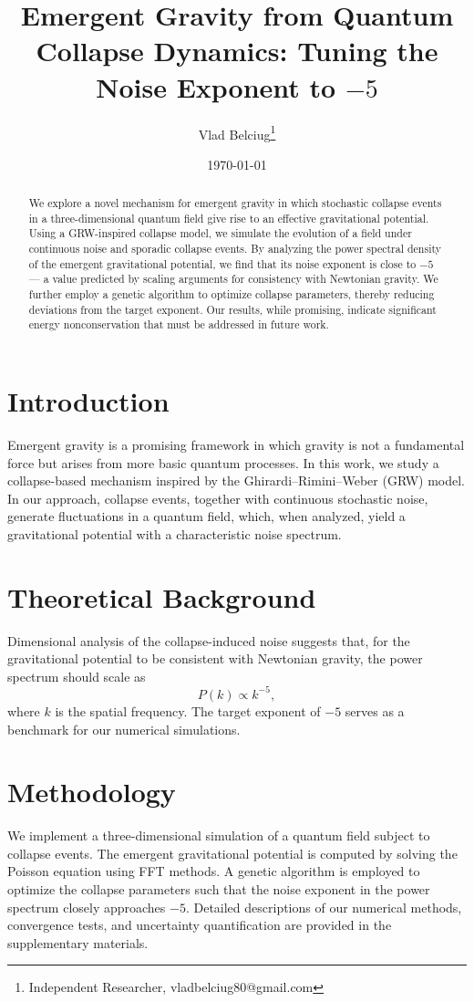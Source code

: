 \documentclass[12pt]{article}
\title{Emergent Gravity from Quantum Collapse Dynamics: Tuning the Noise Exponent to \(-5\)}
\author{Vlad Belciug\thanks{Independent Researcher, vladbelciug80@gmail.com} }
\date{\today}
\begin{document}
\maketitle

\begin{abstract}
We explore a novel mechanism for emergent gravity in which stochastic collapse events in a three-dimensional quantum field give rise to an effective gravitational potential. Using a GRW-inspired collapse model, we simulate the evolution of a field under continuous noise and sporadic collapse events. By analyzing the power spectral density of the emergent gravitational potential, we find that its noise exponent is close to \(-5\) --- a value predicted by scaling arguments for consistency with Newtonian gravity. We further employ a genetic algorithm to optimize collapse parameters, thereby reducing deviations from the target exponent. Our results, while promising, indicate significant energy nonconservation that must be addressed in future work. 
\end{abstract}

\section{Introduction}
Emergent gravity is a promising framework in which gravity is not a fundamental force but arises from more basic quantum processes. In this work, we study a collapse-based mechanism inspired by the Ghirardi--Rimini--Weber (GRW) model. In our approach, collapse events, together with continuous stochastic noise, generate fluctuations in a quantum field, which, when analyzed, yield a gravitational potential with a characteristic noise spectrum. 

\section{Theoretical Background}
Dimensional analysis of the collapse-induced noise suggests that, for the gravitational potential to be consistent with Newtonian gravity, the power spectrum should scale as 
\[
P(k) \propto k^{-5},
\]
where \( k \) is the spatial frequency. The target exponent of \(-5\) serves as a benchmark for our numerical simulations.

\section{Methodology}
We implement a three-dimensional simulation of a quantum field subject to collapse events. The emergent gravitational potential is computed by solving the Poisson equation using FFT methods. A genetic algorithm is employed to optimize the collapse parameters such that the noise exponent in the power spectrum closely approaches \(-5\). Detailed descriptions of our numerical methods, convergence tests, and uncertainty quantification are provided in the supplementary materials.
\end{document}
